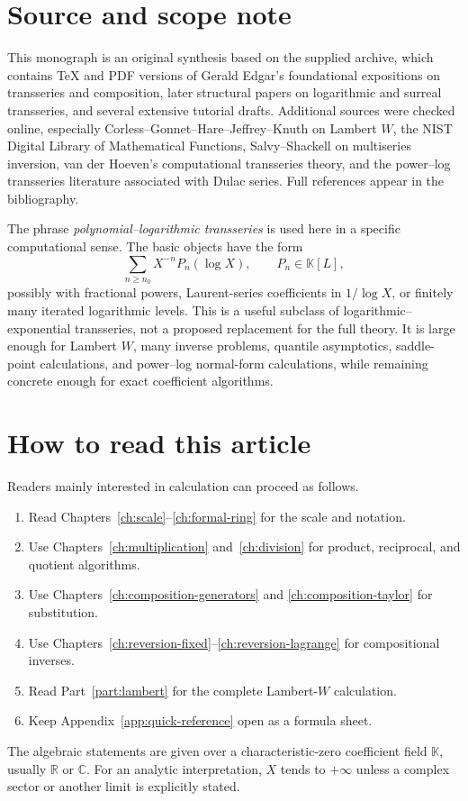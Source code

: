 \documentclass[11pt,oneside]{book}
\theoremstyle{definition}
\theoremstyle{remark}
\newcommand{\K}{\mathbb K}
\newcommand{\R}{\mathbb R}
\newcommand{\C}{\mathbb C}
\begin{document}
\chapter*{Source and scope note}
This monograph is an original synthesis based on the supplied archive, which
contains TeX and PDF versions of Gerald Edgar's foundational expositions on
transseries and composition, later structural papers on logarithmic and
surreal transseries, and several extensive tutorial drafts.  Additional
sources were checked online, especially Corless--Gonnet--Hare--Jeffrey--Knuth
on Lambert $W$, the NIST Digital Library of Mathematical Functions,
Salvy--Shackell on multiseries inversion, van der Hoeven's computational
transseries theory, and the power--log transseries literature associated with
Dulac series.  Full references appear in the bibliography.

The phrase \emph{polynomial--logarithmic transseries} is used here in a
specific computational sense.  The basic objects have the form
\[
 \sum_{n\ge n_0}X^{-n}P_n(\log X),
 \qquad P_n\in\K[L],
\]
possibly with fractional powers, Laurent-series coefficients in
$1/\log X$, or finitely many iterated logarithmic levels.  This is a useful
subclass of logarithmic--exponential transseries, not a proposed replacement
for the full theory.  It is large enough for Lambert $W$, many inverse
problems, quantile asymptotics, saddle-point calculations, and power--log
normal-form calculations, while remaining concrete enough for exact
coefficient algorithms.

\chapter*{How to read this article}
Readers mainly interested in calculation can proceed as follows.
\begin{enumerate}
\item Read Chapters~\ref{ch:scale}--\ref{ch:formal-ring} for the scale and
      notation.
\item Use Chapters~\ref{ch:multiplication} and~\ref{ch:division} for product,
      reciprocal, and quotient algorithms.
\item Use Chapters~\ref{ch:composition-generators} and
      \ref{ch:composition-taylor} for substitution.
\item Use Chapters~\ref{ch:reversion-fixed}--\ref{ch:reversion-lagrange} for
      compositional inverses.
\item Read Part~\ref{part:lambert} for the complete Lambert-$W$ calculation.
\item Keep Appendix~\ref{app:quick-reference} open as a formula sheet.
\end{enumerate}
The algebraic statements are given over a characteristic-zero coefficient
field $\K$, usually $\R$ or $\C$.  For an analytic interpretation, $X$ tends
to $+\infty$ unless a complex sector or another limit is explicitly stated.
\end{document}
